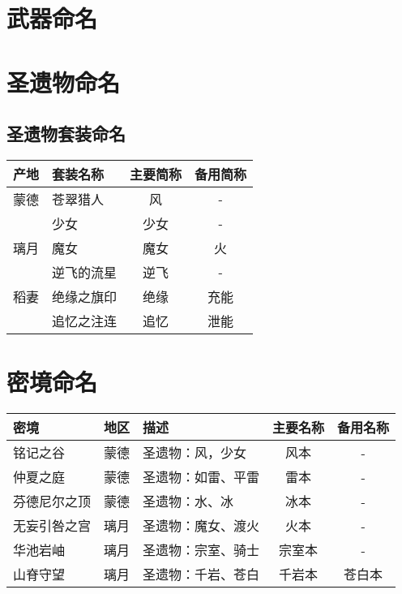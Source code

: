 \documentclass[a4paper,11pt]{report}
\begin{document}
\chapter{武器命名}



\chapter{圣遗物命名}

\section{圣遗物套装命名}

\begin{longtabu}{|c|X[c]|c|c|}
	\hline
	{产地} & {套装名称} & {主要简称} & {备用简称} \\
	\hline
	\endhead
	\hline
	\endfoot
	{蒙德} & {苍翠猎人} & {风} & {-} \\
	{} & {少女} & {少女} & {-} \\
	\hline
	{璃月} & {魔女} & {魔女} & {火} \\
	{} & {逆飞的流星} & {逆飞} & {-} \\
	\hline
	{稻妻} & {绝缘之旗印} & {绝缘} & {充能} \\
	{} & {追忆之注连} & {追忆} & {泄能} \\
\end{longtabu}




\chapter{密境命名}

\begin{longtabu}{|X[c]|c|l|c|c|}
	\hline
	{密境} & {地区} & {描述} & {主要名称} & {备用名称} \\
	\hline
	\endhead
	\hline
	\endfoot
	{铭记之谷} & {蒙德} & {圣遗物：风，少女} & {风本} & {-} \\
	{仲夏之庭} & {蒙德} & {圣遗物：如雷、平雷} & {雷本} & {-} \\
	{芬德尼尔之顶} & {蒙德} & {圣遗物：水、冰} & {冰本} & {-} \\
	{无妄引咎之宫} & {璃月} & {圣遗物：魔女、渡火} & {火本} & {-} \\
	{华池岩岫} & {璃月} & {圣遗物：宗室、骑士} & {宗室本} & {-} \\
	{山脊守望} & {璃月} & {圣遗物：千岩、苍白} & {千岩本} & {苍白本} \\
\end{longtabu}
\end{document}
